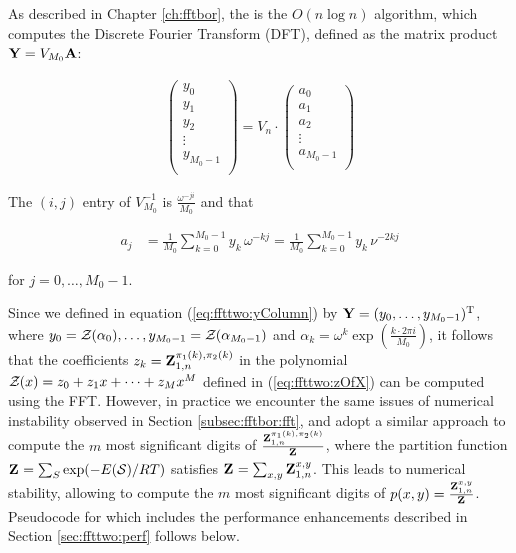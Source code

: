 As described in Chapter \ref{ch:fftbor}, the \fft is the $O(n \log n)$
algorithm, which computes the Discrete Fourier Transform (DFT), defined
as the matrix product ${\bf Y} = V_{M_0} {\bf A}$:

\begin{align}
\label{eq:ffttwo:dftMatrix}
\left(
\begin{array}{l}
y_0 \\
y_1 \\
y_2 \\
\vdots \\
y_{M_0-1} \\
\end{array}
\right)
= V_n \cdot
\left(
\begin{array}{l}
a_0 \\
a_1 \\
a_2 \\
\vdots \\
a_{M_0-1} \\
\end{array}
\right)
\end{align}

The $(i,j)$ entry of $V_{M_0}^{-1}$ is $\frac{\omega^{-j i}}{M_0}$
and that

\begin{align}
\label{eq:ffttwo:aFromY}
a_j &=\frac{1}{M_0} \sum_{k=0}^{M_0-1} y_k\, \omega^{-kj}
=\frac{1}{M_0} \sum_{k=0}^{M_0-1} y_k\, \nu^{-2kj}
\end{align}

for $j=0,\dots,M_0-1$.

Since we defined \bfY in equation (\ref{eq:ffttwo:yColumn}) by ${\bf Y} =
(y_0,\dots,y_{M_0-1})^{\text T}$, where
$y_0={\mathcal Z}_{}(\alpha_0),\dots,\allowbreak y_{M_0-1}={\mathcal Z}_{}(\alpha_{M_0-1})$
and $\alpha_k = \omega^k
\exp(\frac{k \cdot 2\pi i}{M_0})$,
it follows that the coefficients
$z_k={\bf Z}^{\pi_1(k),\pi_2(k)}_{1,n}$ in the polynomial
${\mathcal Z}_{}(x) = z_0 + z_1 x + \dots + z_{M} x^{M}$ defined in
(\ref{eq:ffttwo:zOfX}) can be computed using the FFT.
However, in practice we encounter the same issues of numerical instability
observed in Section \ref{subsec:fftbor:fft}, and adopt a similar approach
to compute the $m$ most significant
digits of $\frac{{\bf Z}^{\pi_1(k),\pi_2(k)}_{1,n}}{{\bf Z}^{}_{}}$,
where the partition function ${\bf Z}^{}_{} = \sum_{S} \exp(-E(\mathcal S)/RT)$ satisfies
${{\bf Z}^{}_{}} = \sum_{x,y} {\bf Z}^{x,y}_{1,n}$. This leads to numerical stability,
allowing \ffttwo to compute the
$m$ most significant digits of $p(x,y) = \frac{{\bf Z}^{x,y}_{1,n}}{{\bf Z}^{}_{}}$.
Pseudocode for \ffttwo which includes the performance enhancements described in
Section \ref{sec:ffttwo:perf} follows below.

